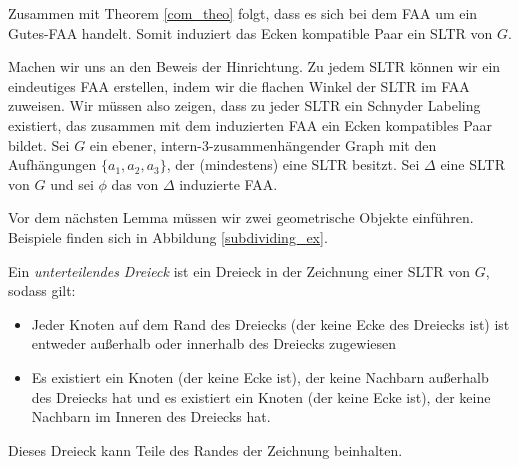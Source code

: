 Zusammen mit Theorem \ref{com_theo} folgt, dass es sich bei dem FAA um ein Gutes-FAA handelt. Somit induziert das Ecken kompatible Paar ein SLTR von $G$.

Machen wir uns an den Beweis der Hinrichtung. Zu jedem SLTR können wir ein eindeutiges FAA erstellen, indem wir die flachen Winkel der SLTR im FAA zuweisen. Wir müssen also zeigen, dass zu jeder SLTR ein Schnyder Labeling existiert, das zusammen mit dem induzierten FAA ein Ecken kompatibles Paar bildet. Sei $G$ ein ebener, intern-3-zusammenhängender Graph mit den Aufhängungen $\{a_1,a_2,a_3\}$, der (mindestens) eine SLTR besitzt. Sei $\Delta$ eine SLTR von $G$ und sei $\phi$ das von $\Delta$ induzierte FAA.

Vor dem nächsten Lemma müssen wir zwei geometrische Objekte einführen. Beispiele finden sich in Abbildung \ref{subdividing_ex}.

\begin{definition}
Ein \textit{unterteilendes Dreieck} ist ein Dreieck in der Zeichnung einer SLTR von $G$, sodass gilt:
\begin{itemize}
\item Jeder Knoten auf dem Rand des Dreiecks (der keine Ecke des Dreiecks ist) ist entweder außerhalb oder innerhalb des Dreiecks zugewiesen
\item Es existiert ein Knoten (der keine Ecke ist), der keine Nachbarn außerhalb des Dreiecks hat und es existiert ein Knoten (der keine Ecke ist), der keine Nachbarn im Inneren des Dreiecks hat.
\end{itemize}
Dieses Dreieck kann Teile des Randes der Zeichnung beinhalten.
\end{definition}

